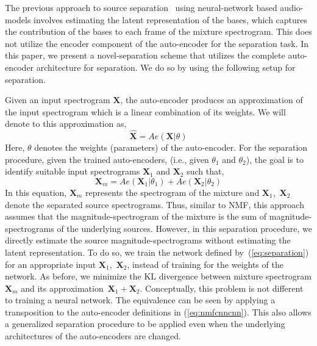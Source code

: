 \documentclass{article}
\begin{document}
The previous approach to source separation~\cite{smaragdis2017aneural} using neural-network based audio-models involves estimating the latent representation of the bases, which captures the contribution of the bases to each frame of the mixture spectrogram. This does not utilize the encoder component of the auto-encoder for the separation task. In this paper, we present a novel-separation scheme that utilizes the complete auto-encoder architecture for separation. We do so by using the following setup for separation. 

Given an input spectrogram $\mathbf{X}$, the auto-encoder produces an approximation of the input spectrogram which is a linear combination of its weights. We will denote to this approximation as,
\begin{equation}
    \hat{\mathbf{X}} = Ae(\mathbf{X}|\theta)
    \label{eq:separation_ae}
\end{equation}
Here, $\theta$ denotes the weights (parameters) of the auto-encoder. For the separation procedure, given the trained auto-encoders, (i.e., given $\theta_{1}$ and $\theta_{2}$), the goal is to identify suitable input spectrograms $\mathbf{X}_{1}$ and $\mathbf{X}_{2}$ such that,
\begin{equation}
    \mathbf{X}_{m} = Ae(\mathbf{X}_{1}|\theta_{1}) + Ae(\mathbf{X}_{2}|\theta_{2}) 
    \label{eq:separation}
\end{equation}
In this equation, $\mathbf{X}_{m}$ represents the spectrogram of the mixture and $\mathbf{X}_{1}$,~$\mathbf{X}_{2}$ denote the separated source spectrograms. Thus, similar to NMF, this approach assumes that the magnitude-spectrogram of the mixture is the sum of magnitude-spectrograms of the underlying sources. However, in this separation procedure, we directly estimate the source magnitude-spectrograms without estimating the latent representation. To do so, we train the network defined by~(\ref{eq:separation}) for an appropriate input $\mathbf{X}_{1}$,~$\mathbf{X}_{2}$, instead of training for the weights of the network. As before, we minimize the KL divergence between mixture spectrogram $\mathbf{X}_{m}$ and its approximation~$\mathbf{X}_{1} + \mathbf{X}_{2}$. Conceptually, this problem is not different to training a neural network. The equivalence can be seen by applying a transposition to the auto-encoder definitions in (\ref{eq:nmfcnncnn}). This also allows a generalized separation procedure to be applied even when the underlying architectures of the auto-encoders are changed.
\end{document}
